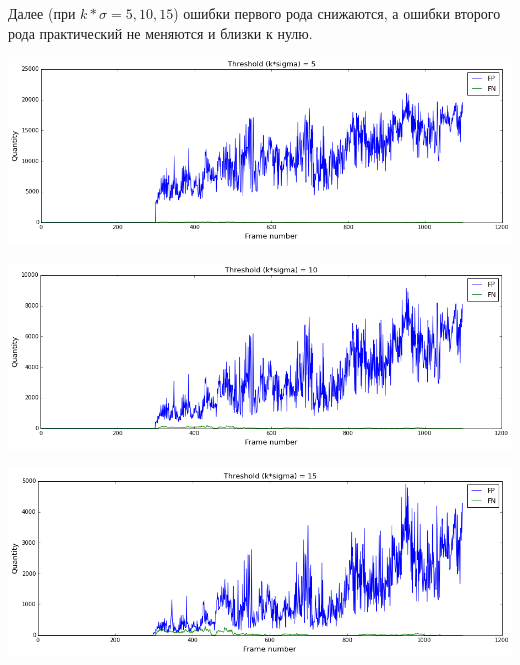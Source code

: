 \documentclass[12pt, a4paper]{article}
\begin{document}
			Далее (при $k * \sigma = 5, 10, 15$) ошибки первого рода снижаются, а ошибки второго рода практический не меняются и близки к нулю.
			\begin{center}
				\includegraphics[width=17cm]{1par_k_5.png}
			\end{center}
			\begin{center}
				\includegraphics[width=17cm]{1par_k_10.png}
			\end{center}
			\begin{center}
				\includegraphics[width=17cm]{1par_k_15.png}
			\end{center}
\end{document}

